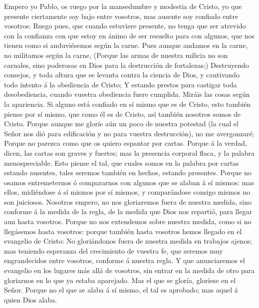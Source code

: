  Empero yo Pablo, os ruego por la mansedumbre y modestia de
Cristo, yo que presente ciertamente soy bajo entre vosotros, mas ausente
soy confiado entre vosotros:  Ruego pues, que cuando
estuviere presente, no tenga que ser atrevido con la confianza con que
estoy en ánimo de ser resuelto para con algunos, que nos tienen como si
anduviésemos según la carne.  Pues aunque andamos en la
carne, no militamos según la carne,  (Porque las armas de
nuestra milicia no son carnales, sino poderosas en Dios para la
destrucción de fortalezas;)  Destruyendo consejos, y toda
altura que se levanta contra la ciencia de Dios, y cautivando todo
intento á la obediencia de Cristo;  Y estando prestos para
castigar toda desobediencia, cuando vuestra obediencia fuere cumplida.
 Miráis las cosas según la apariencia. Si alguno está
confiado en sí mismo que es de Cristo, esto también piense por sí mismo,
que como él es de Cristo, así también nosotros somos de Cristo.
 Porque aunque me gloríe aún un poco de nuestra potestad (la
cual el Señor nos dió para edificación y no para vuestra destrucción),
no me avergonzaré;  Porque no parezca como que os quiero
espantar por cartas.  Porque á la verdad, dicen, las cartas
son graves y fuertes; mas la presencia corporal flaca, y la palabra
menospreciable.  Esto piense el tal, que cuales somos en la
palabra por cartas estando ausentes, tales seremos también en hechos,
estando presentes.  Porque no osamos entremeternos ó
compararnos con algunos que se alaban á sí mismos: mas ellos, midiéndose
á sí mismos por sí mismos, y comparándose consigo mismos no son
juiciosos.  Nosotros empero, no nos gloriaremos fuera de
nuestra medida, sino conforme á la medida de la regla, de la medida que
Dios nos repartió, para llegar aun hasta vosotros.  Porque
no nos extendemos sobre nuestra medida, como si no llegásemos hasta
vosotros: porque también hasta vosotros hemos llegado en el evangelio de
Cristo:  No gloriándonos fuera de nuestra medida en
trabajos ajenos; mas teniendo esperanza del crecimiento de vuestra fe,
que seremos muy engrandecidos entre vosotros, conforme á nuestra regla.
 Y que anunciaremos el evangelio en los lugares más allá de
vosotros, sin entrar en la medida de otro para gloriarnos en lo que ya
estaba aparejado.  Mas el que se gloría, gloríese en el
Señor.  Porque no el que se alaba á sí mismo, el tal es
aprobado; mas aquel á quien Dios alaba.

